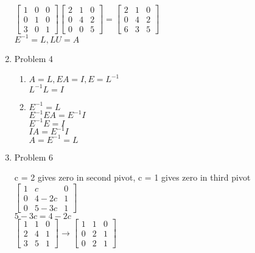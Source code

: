 \documentclass{article}
\renewcommand{\(}{\left(}
\renewcommand{\)}{\right)}
\theoremstyle{plain}
\theoremstyle{plain}
\theoremstyle{definition}
\begin{document}
\begin{enumerate}[label*=\arabic*.,ref=\arabic*]
\begin{shaded}
$\begin{bmatrix} 1 & 0 & 0 \\ 0 & 1 & 0 \\ 3 & 0 & 1 \end{bmatrix} \begin{bmatrix} 2 & 1 & 0 \\ 0 & 4 & 2 \\ 0 & 0 & 5 \end{bmatrix} = \begin{bmatrix} 2 & 1 & 0 \\ 0 & 4 & 2 \\ 6 & 3 & 5 \end{bmatrix}$ \\

$E^{-1} = L, LU = A$
\end{shaded}

\item Problem 4
\begin{shaded}
\begin{enumerate}[label=\alph*)]
\item 
$A = L, EA = I, E = L^{-1}$ \\
$L^{-1}L = I$
\item 
$E^{-1} = L$ \\
$E^{-1}EA = E^{-1}I$ \\
$E^{-1}E = I$ \\
$IA = E^{-1}I$ \\
$A = E^{-1} = L$ 
\end{enumerate}
\end{shaded}

\item Problem 6
\begin{shaded}
c = 2 gives zero in second pivot, c = 1 gives zero in third pivot \\

$\begin{bmatrix} 1 & c & 0 \\ 0 & 4-2c & 1 \\ 0 & 5-3c & 1 \end{bmatrix}$ \\

$5 - 3c = 4 - 2c$ \\

$\begin{bmatrix} 1 & 1 & 0 \\ 2 & 4 & 1 \\ 3 & 5 & 1 \end{bmatrix} \rightarrow \begin{bmatrix} 1 & 1 & 0 \\ 0 & 2 & 1 \\ 0 & 2 & 1 \end{bmatrix}$
\end{shaded}


\end{enumerate}
\end{document}
